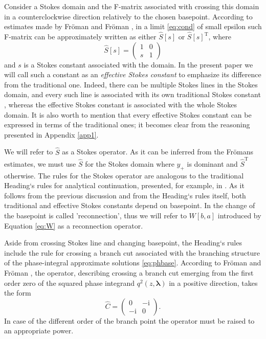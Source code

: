 \documentclass[atmp]{ipart_v1}
\def\rmi{\mathrm{i}}
\def\lmbd{\bm{\lambda}}
\def\S{\widehat{S}}
\def\C{\widehat{C}}
\def\T{\mathrm{T}}
\newcommand\eref[1]{\eqref{#1}}
\newcommand\Eref[1]{Equation \ref{#1}}
\newcommand\Aref[1]{Appendix \ref{#1}}
\begin{document}
Consider a Stokes domain and the F-matrix associated with crossing this domain in a 
counterclockwise direction relatively to the chosen basepoint. According to estimates 
made by Fr\"oman and Fr\"oman \cite{frbook}, in a limit \eref{eq:cond} of small epsilon 
such F-matrix can be approximately written as either $\S[s]$ or $\S[s]^{\T}$, where
\begin{equation}
\S[s] = \left(\begin{array}{*{2}{c}} 1 & 0 \\ s & 1 \end{array}\right)    
\end{equation}
and $s$ is a Stokes constant associated with the domain. 
In the present paper we will call such a constant as an \textit{effective Stokes constant} 
to emphasize its difference from the traditional one. Indeed, there can be multiple Stokes 
lines in the Stokes domain, and every such line is associated with its own traditional Stokes 
constant \cite{heading, rwbook}, whereas the effective Stokes constant is associated with 
the whole Stokes domain. It is also worth to mention that every effective Stokes constant can be 
expressed in terms of the traditional ones; it becomes clear from the reasoning presented in \Aref{app1}.

We will refer to $\S$ as a Stokes operator. As it can be inferred from the Fr\"omans estimates,
we must use $\S$ for the Stokes domain where $y_+$ is dominant and $\S^{\T}$ otherwise. The rules
for the Stokes operator are analogous to the traditional Heading`s rules for analytical 
continuation, presented, for example, in \cite{heading, rwbook}. As it follows from the previous discussion
and from the Heading`s rules itself, both traditional and effective Stokes constants depend on basepoint.
In \cite{heading, rwbook} the change of the basepoint is called 'reconnection', thus we will
refer to $W[b,a]$ introduced by \Eref{eq:W} as a reconnection operator.

Aside from crossing Stokes line and changing basepoint, the Heading`s rules include the rule for crossing a 
branch cut associated with the branching structure of the phase-integral approximate solutions \eref{eq:phbase}.
According to Fr\"oman and Fr\"oman \cite{frbook}, the operator, describing crossing a branch cut emerging 
from the first order zero of the squared phase integrand $q^2(z,\lmbd)$ in a positive direction, takes the form
\begin{equation}
\C =  \left(\begin{array}{*{2}{c}} 0 & -\rmi \\ -\rmi & 0 \end{array}\right).    
\label{eq:C}
\end{equation}
In case of the different order of the branch point the operator must be raised to an appropriate power.
\end{document}

